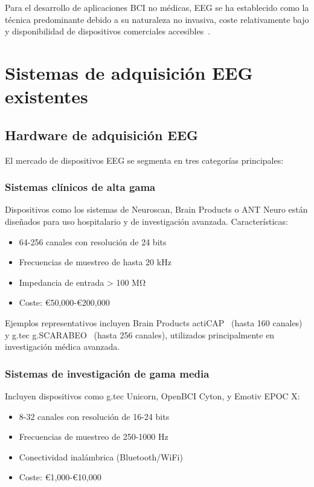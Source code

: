 Para el desarrollo de aplicaciones BCI no médicas, EEG se ha establecido como la técnica predominante debido a su naturaleza no invasiva, coste relativamente bajo y disponibilidad de dispositivos comerciales accesibles~\cite{eeg_bci_review}.

\section{Sistemas de adquisición EEG existentes}
\label{sec:sistemas_eeg}

\subsection{Hardware de adquisición EEG}
\label{subsec:hardware_eeg}

El mercado de dispositivos EEG se segmenta en tres categorías principales:

\subsubsection{Sistemas clínicos de alta gama}
Dispositivos como los sistemas de Neuroscan, Brain Products o ANT Neuro están diseñados para uso hospitalario y de investigación avanzada. Características:
\begin{itemize}
    \item 64-256 canales con resolución de 24 bits
    \item Frecuencias de muestreo de hasta 20 kHz
    \item Impedancia de entrada > 100 MΩ
    \item Coste: €50,000-€200,000
\end{itemize}

Ejemplos representativos incluyen Brain Products actiCAP~\cite{brainproducts_acticap} (hasta 160 canales) y g.tec g.SCARABEO~\cite{gtec_scarabeo} (hasta 256 canales), utilizados principalmente en investigación médica avanzada.

\subsubsection{Sistemas de investigación de gama media}
Incluyen dispositivos como g.tec Unicorn, OpenBCI Cyton, y Emotiv EPOC X:
\begin{itemize}
    \item 8-32 canales con resolución de 16-24 bits
    \item Frecuencias de muestreo de 250-1000 Hz
    \item Conectividad inalámbrica (Bluetooth/WiFi)
    \item Coste: €1,000-€10,000
\end{itemize}

